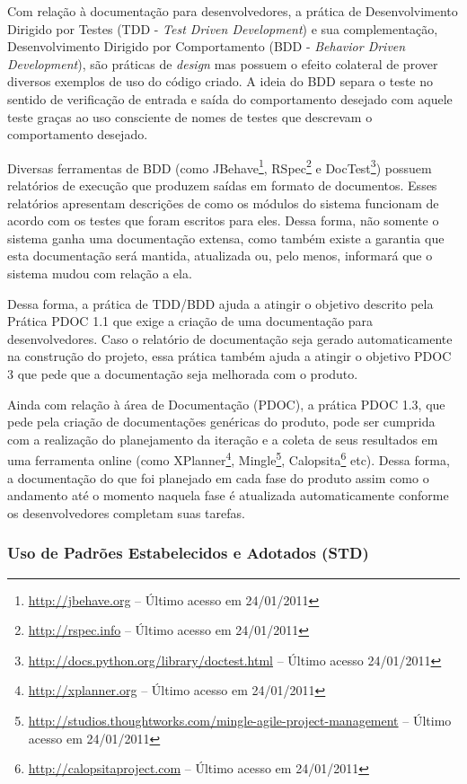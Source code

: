 Com relação à documentação para desenvolvedores, a prática de
Desenvolvimento Dirigido por Testes (TDD - \textit{Test Driven
  Development}) e sua complementação, Desenvolvimento Dirigido por
Comportamento (BDD - \textit{Behavior Driven Development}), são
práticas de \textit{design} mas possuem o efeito colateral de prover
diversos exemplos de uso do código criado. A ideia do BDD separa o
teste no sentido de verificação de entrada e saída do comportamento
desejado com aquele teste graças ao uso consciente de nomes de testes
que descrevam o comportamento desejado.

Diversas ferramentas de BDD (como
JBehave\footnote{\url{http://jbehave.org} -- Último acesso em
  24/01/2011}, RSpec\footnote{\url{http://rspec.info} -- Último acesso
  em 24/01/2011} e
DocTest\footnote{\url{http://docs.python.org/library/doctest.html} --
  Último acesso 24/01/2011}) possuem relatórios de execução que
produzem saídas em formato de documentos. Esses relatórios apresentam
descrições de como os módulos do sistema funcionam de acordo com os
testes que foram escritos para eles. Dessa forma, não somente o
sistema ganha uma documentação extensa, como também existe a garantia
que esta documentação será mantida, atualizada ou, pelo menos,
informará que o sistema mudou com relação a ela.

Dessa forma, a prática de TDD/BDD ajuda a atingir o objetivo descrito
pela Prática PDOC 1.1 que exige a criação de uma documentação para
desenvolvedores. Caso o relatório de documentação seja gerado
automaticamente na construção do projeto, essa prática também ajuda a
atingir o objetivo PDOC 3 que pede que a documentação seja melhorada
com o produto.

Ainda com relação à área de Documentação (PDOC), a prática PDOC 1.3,
que pede pela criação de documentações genéricas do produto, pode ser
cumprida com a realização do planejamento da iteração e a coleta de
seus resultados em uma ferramenta online (como
XPlanner\footnote{\url{http://xplanner.org} -- Último acesso em
  24/01/2011},
Mingle\footnote{\url{http://studios.thoughtworks.com/mingle-agile-project-management}
  -- Último acesso em 24/01/2011},
Calopsita\footnote{\url{http://calopsitaproject.com} -- Último acesso
  em 24/01/2011} etc). Dessa forma, a documentação do que foi
planejado em cada fase do produto assim como o andamento até o momento
naquela fase é atualizada automaticamente conforme os desenvolvedores
completam suas tarefas.

\subsubsection{Uso de Padrões Estabelecidos e Adotados (STD)}
\label{sec:+std}

